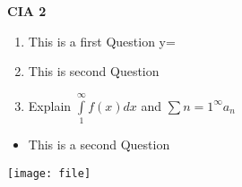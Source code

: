 \documentclass[10pt, a4paper]{article}
\begin{document}
\textbf{CIA 2}
\def\eq{y=}
\begin{enumerate}
    \item This is a first Question \eq
    \item This is second Question
    \item Explain $\int\limits_{1}^{\infty}f(x)dx$ and $\sum\limits{n=1}^{\infty} a_n$
\end{enumerate}
\begin{itemize}
    \item This is a second Question
\end{itemize}
\begin{center}
    \texttt{[image: file]}
\end{center}
\end{document}
